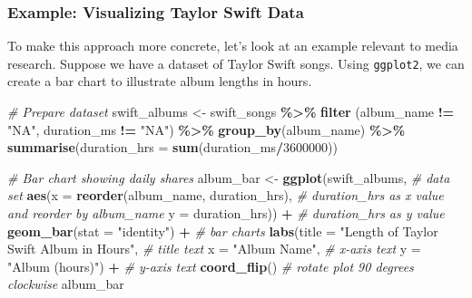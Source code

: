 \documentclass[
]{book}
\newenvironment{Shaded}{\begin{snugshade}}{\end{snugshade}}
\newcommand{\AttributeTok}[1]{\textcolor[rgb]{0.13,0.29,0.53}{#1}}
\newcommand{\CommentTok}[1]{\textcolor[rgb]{0.56,0.35,0.01}{\textit{#1}}}
\newcommand{\DecValTok}[1]{\textcolor[rgb]{0.00,0.00,0.81}{#1}}
\newcommand{\FunctionTok}[1]{\textcolor[rgb]{0.13,0.29,0.53}{\textbf{#1}}}
\newcommand{\NormalTok}[1]{#1}
\newcommand{\OtherTok}[1]{\textcolor[rgb]{0.56,0.35,0.01}{#1}}
\newcommand{\SpecialCharTok}[1]{\textcolor[rgb]{0.81,0.36,0.00}{\textbf{#1}}}
\newcommand{\StringTok}[1]{\textcolor[rgb]{0.31,0.60,0.02}{#1}}
\begin{document}
\subsubsection*{Example: Visualizing Taylor Swift Data}\label{example-visualizing-taylor-swift-data}

To make this approach more concrete, let's look at an example relevant to media research. Suppose we have a dataset of Taylor Swift songs. Using \texttt{ggplot2}, we can create a bar chart to illustrate album lengths in hours.

\begin{Shaded}
\begin{Highlighting}[]
\CommentTok{\# Prepare dataset}
\NormalTok{swift\_albums }\OtherTok{\textless{}{-}}\NormalTok{ swift\_songs }\SpecialCharTok{\%\textgreater{}\%}
  \FunctionTok{filter}\NormalTok{ (album\_name }\SpecialCharTok{!=} \StringTok{"NA"}\NormalTok{,}
\NormalTok{          duration\_ms }\SpecialCharTok{!=} \StringTok{"NA"}\NormalTok{) }\SpecialCharTok{\%\textgreater{}\%}
  \FunctionTok{group\_by}\NormalTok{(album\_name) }\SpecialCharTok{\%\textgreater{}\%}
  \FunctionTok{summarise}\NormalTok{(}\AttributeTok{duration\_hrs =} \FunctionTok{sum}\NormalTok{(duration\_ms}\SpecialCharTok{/}\DecValTok{3600000}\NormalTok{))}

\CommentTok{\# Bar chart showing daily shares}
\NormalTok{album\_bar }\OtherTok{\textless{}{-}} \FunctionTok{ggplot}\NormalTok{(swift\_albums, }\CommentTok{\# data set}
       \FunctionTok{aes}\NormalTok{(}\AttributeTok{x =} \FunctionTok{reorder}\NormalTok{(album\_name, duration\_hrs), }\CommentTok{\# duration\_hrs as x value and reorder by album\_name}
           \AttributeTok{y =}\NormalTok{ duration\_hrs)) }\SpecialCharTok{+} \CommentTok{\# duration\_hrs as y value}
  \FunctionTok{geom\_bar}\NormalTok{(}\AttributeTok{stat =} \StringTok{"identity"}\NormalTok{) }\SpecialCharTok{+} \CommentTok{\# bar charts}
  \FunctionTok{labs}\NormalTok{(}\AttributeTok{title =} \StringTok{"Length of Taylor Swift Album in Hours"}\NormalTok{, }\CommentTok{\# title text}
       \AttributeTok{x =} \StringTok{"Album Name"}\NormalTok{, }\CommentTok{\# x{-}axis text}
       \AttributeTok{y =} \StringTok{"Album (hours)"}\NormalTok{) }\SpecialCharTok{+} \CommentTok{\# y{-}axis text}
  \FunctionTok{coord\_flip}\NormalTok{() }\CommentTok{\# rotate plot 90 degrees clockwise}
\NormalTok{album\_bar}
\end{Highlighting}
\end{Shaded}
\end{document}
